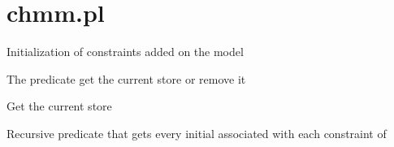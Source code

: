 


\section{chmm.pl}

\label{sec:chmm}

\begin{description}
Initialization of constraints added on the model

The predicate get the current store or remove it

Get the current store

Recursive predicate that gets every initial  associated
with each constraint of 
\end{description}

